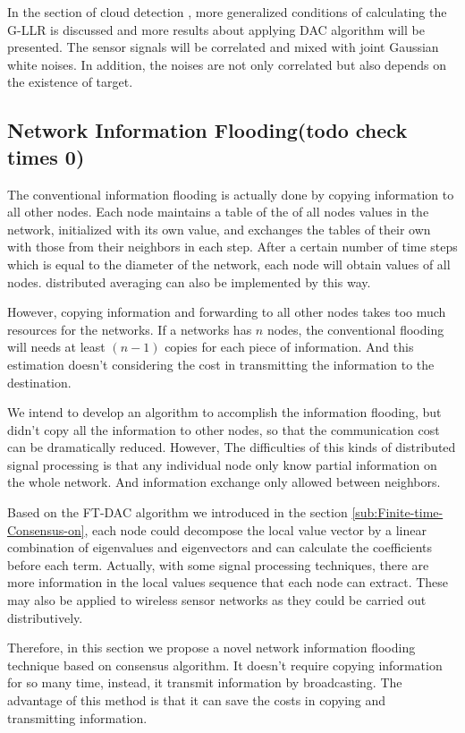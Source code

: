 In the section of cloud detection ,
more generalized conditions of calculating the G-LLR is discussed
and more results about applying DAC algorithm will be presented. The
sensor signals will be correlated and mixed with joint Gaussian white
noises. In addition, the noises are not only correlated but also depends
on the existence of target. 


\subsection{Network Information Flooding(todo check times 0)}

The conventional information flooding is actually done by copying
information to all other nodes. Each node maintains a table of the
of all nodes values in the network, initialized with its own value,
and exchanges the tables of their own with those from their neighbors
in each step. After a certain number of time steps which is equal
to the diameter of the network, each node will obtain values of all
nodes. distributed averaging can also be implemented by this way. 

However, copying information and forwarding to all other nodes takes
too much resources for the networks. If a networks has $n$ nodes,
the conventional flooding will needs at least $\left(n-1\right)$
copies for each piece of information. And this estimation doesn't
considering the cost in transmitting the information to the destination.

We intend to develop an algorithm to accomplish the information flooding,
but didn't copy all the information to other nodes, so that the communication
cost can be dramatically reduced. However, The difficulties of this
kinds of distributed signal processing is that any individual node
only know partial information on the whole network. And information
exchange only allowed between neighbors. 

Based on the FT-DAC algorithm we introduced in the section \ref{sub:Finite-time-Consensus-on},
each node could decompose the local value vector by a linear combination
of eigenvalues and eigenvectors and can calculate the coefficients
before each term. Actually, with some signal processing techniques,
there are more information in the local values sequence that each
node can extract. These may also be applied to wireless sensor networks
as they could be carried out distributively. 

Therefore, in this section we propose a novel network information
flooding technique based on consensus algorithm. It doesn't require
copying information for so many time, instead, it transmit information
by broadcasting. The advantage of this method is that it can save
the costs in copying and transmitting information. 

